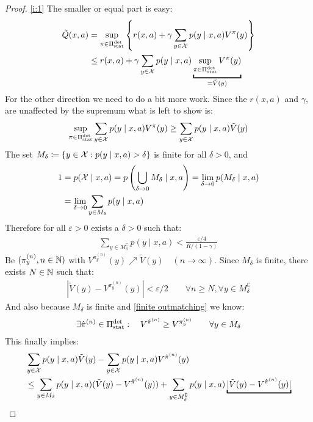\begin{proof} \ref{i:1} The smaller or equal part is easy:
	\begin{align*}
		\tilde{Q}(x,a)&= \sup_{\pi \in \detPolicy} \left\{r(x,a)
		+\gamma\sum_{y\in\cX}p(y\mid x,a) V^\pi(y)\right\}\\
		&\le r(x,a) +\gamma\sum_{y\in\cX}p(y\mid x,a) \underbracket{\sup_{\pi \in \detPolicy}V^\pi(y)}_{=\tilde{V}(y)}
	\end{align*}
	For the other direction we need to do a bit more work. Since the \(r(x,a)\) and \(\gamma\), are unaffected by the supremum what is left to show is:
	\[
		\sup_{\pi \in \Pi_{\textnormal{stat}}^{\textnormal{det}}}\sum_{y\in\mathcal{X}}p(y\mid x,a) V^\pi(y)
		\ge\sum_{y\in\mathcal{X}}p(y\mid x,a)\tilde{V}(y)
	\]
	The set \(M_\delta\coloneqq \{y\in\mathcal{X} : p(y\mid x,a)>\delta \} \) is finite for all \(\delta>0\), and
	\begin{align*}
		1&=p(\mathcal{X}\mid x,a)=p\left(\bigcup_{\delta \to 0} M_\delta \mid x, a \right)
		= \lim_{\delta\to 0} p(M_\delta\mid x,a) \\
		&=\lim_{\delta\to 0} \sum_{y\in M_\delta} p(y\mid x,a)
	\end{align*}
	Therefore for all \(\varepsilon >0\) exists a \(\delta>0\) such that:
	\begin{align}
		\sum_{y\in M_\delta^\complement}p(y\mid x,a) < \frac{\varepsilon /4}{R/(1-\gamma)}
		\label{Mcomplement}
	\end{align}
	Be \((\pi_y^{(n)},n\in\mathbb{N} )\) with \(V^{\pi_y^{(n)}}(y) \nearrow \tilde{V}(y) \quad (n\to\infty) \). Since \(M_\delta\) is finite, there exists \(N\in\mathbb{N} \) such that:
	\begin{align}
		|\tilde{V}(y) -V^{\pi_y^{(n)}}(y)|< \varepsilon/2
		\qquad \forall n\ge N, \forall y\in M_\delta^\complement
		\label{convergenceToTilde}
	\end{align}
	And also because \(M_\delta \) is finite and \ref{finite outmatching} we know:
	\begin{align}
	\exists\hat{\pi}^{(n)}\in\Pi_{\textnormal{stat}}^{\textnormal{det}} : 
	\quad {V^{\hat{\pi}^{(n)}}\ge V^{\pi_y^{(n)}}}
	\qquad \forall y\in M_\delta
	\label{piHat over finite set}
	\end{align}
	This finally implies:
	\begin{align*}
		&\sum_{y\in\cX}p(y\mid x,a)\tilde{V}(y) 
		- \sum_{y\in\cX}p(y\mid x,a) V^{\hat{\pi}^{(n)}}(y) \\
		&\le \sum_{y\in M_\delta}p(y\mid x,a) (\tilde{V}(y) - V^{\hat{\pi}^{(n)}}(y))
		+ \sum_{y\in M_\delta^\complement}p(y\mid x,a) 
		\underbracket{|\tilde{V}(y) - V^{\hat{\pi}^{(n)}}(y)|}_{
}
\end{align*}
\end{proof}
